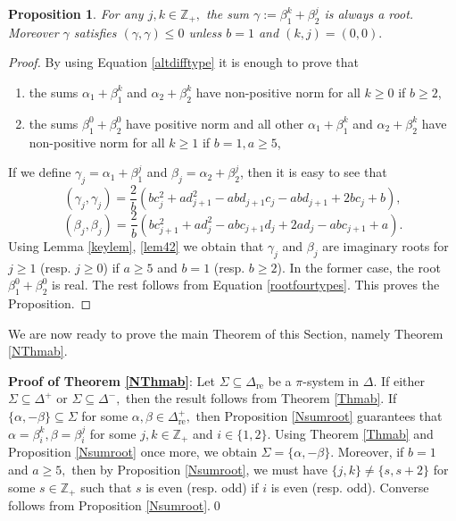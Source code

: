 \documentclass[12pt,reqno]{amsart}
\theoremstyle{plain}
\newtheorem{prop}{Proposition}
\theoremstyle{definition}
\theoremstyle{remark}
\newcommand\bz{\mathbb Z}
\begin{document}
\begin{prop}\label{Nsumdiff}
For any $j,k\in\bz_+,$ the sum $\gamma:=\beta_{1}^{k}+\beta_{2}^{j}$ is always a root. Moreover $\gamma$ satisfies $(\gamma,\gamma)\le 0$ unless $b=1$ and $(k,j)=(0,0).$ 
\end{prop}
\begin{proof}
    By using Equation \ref{altdifftype} it is enough to prove that
\begin{enumerate}
    \item  the sums $\alpha_1+\beta_1^k$ and $\alpha_2+\beta_2^k$ have non-positive norm for all $k\geq 0$ if $b\geq 2$,
    \item the sums $\beta_1^0+\beta_2^0$ have positive norm and all other $\alpha_1+\beta_1^k$ and $\alpha_2+\beta_2^k$ have non-positive norm for all $k\geq 1$ if $b=1,a\geq 5$,
    \end{enumerate}
    If we define $\gamma_j=\alpha_1+\beta_1^j$ and $\beta_j=\alpha_2+\beta_2^j$, then it is easy to see that 
    $$(\gamma_j,\gamma_j)=\frac{2}{b}(bc_j^2+ad_{j+1}^2-abd_{j+1}c_j-abd_{j+1}+2bc_j+b),$$
    $$(\beta_j,\beta_j)=\frac{2}{b}(bc_{j+1}^2+ad_j^2-abc_{j+1}d_j+2ad_j-abc_{j+1}+a).$$
    Using Lemma \ref{keylem}, \ref{lem42} we obtain that $\gamma_j$ and $\beta_j$ are imaginary roots for $j\geq 1$ (resp. $j\geq 0$) if $a\geq 5$ and $b=1$ (resp. $b\geq 2$). In the former case, the root $\beta_1^0+\beta_2^0$ is real. The rest follows from Equation \ref{rootfourtypes}. This proves the Proposition.
\end{proof}
\fi

We are now ready to prove the main Theorem of this Section, namely Theorem \ref{NThmab}.
\medskip

\noindent \textbf{Proof of Theorem \ref{NThmab}}: Let $\Sigma\subseteq \Delta_{\mathrm{re}}$ be a $\pi$-system in $\Delta.$ If either $\Sigma\subseteq \Delta^+$ or $\Sigma\subseteq \Delta^-,$ then the result follows from Theorem \ref{Thmab}. If $\{\alpha,-\beta\}\subseteq\Sigma$ for some $\alpha,\beta\in \Delta^+_{\mathrm{re}},$ then Proposition \ref{Nsumroot} guarantees that $\alpha=\beta_i^{k},\beta=\beta_i^j$ for some $j,k\in\bz_+$ and $i\in\{1,2\}.$ Using Theorem \ref{Thmab} and Proposition \ref{Nsumroot} once more, we obtain $\Sigma=\{\alpha,-\beta\}.$ Moreover, if $b=1$ and $a\geq 5,$ then by Proposition \ref{Nsumroot}, we must have $\{j,k\}\neq \{s,s+2\}$ for some $s\in\bz_+$ such that $s$ is even (resp. odd)  if $i$ is even (resp. odd). Converse follows from Proposition \ref{Nsumroot}.\qed
\end{document}
